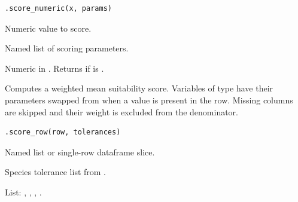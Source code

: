 \documentclass[a4paper]{book}
\begin{document}
%
\begin{Usage}
\begin{verbatim}
.score_numeric(x, params)
\end{verbatim}
\end{Usage}
%
\begin{Arguments}
\begin{ldescription}
\item[\code{x}] Numeric value to score.

\item[\code{params}] Named list of scoring parameters.
\end{ldescription}
\end{Arguments}
%
\begin{Value}
Numeric in . Returns  if  is .
\end{Value}
%
\begin{Description}
Computes a weighted mean suitability score. Variables of type 
have their parameters swapped from  when a
 value is present in the row. Missing columns are skipped and their
weight is excluded from the denominator.
\end{Description}
%
\begin{Usage}
\begin{verbatim}
.score_row(row, tolerances)
\end{verbatim}
\end{Usage}
%
\begin{Arguments}
\begin{ldescription}
\item[\code{row}] Named list or single-row dataframe slice.

\item[\code{tolerances}] Species tolerance list from .
\end{ldescription}
\end{Arguments}
%
\begin{Value}
List: , , , .
\end{Value}
%
\end{document}
